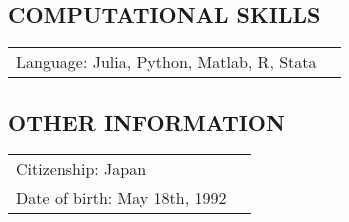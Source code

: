 \documentclass{article}
\begin{document}
\subsection*{COMPUTATIONAL SKILLS}
\begin{tabularx}{\textwidth}{lX}
Language: Julia, Python, Matlab, R, Stata
\end{tabularx}

\subsection*{OTHER INFORMATION}
\begin{tabularx}{\textwidth}{lX}
Citizenship: Japan \\
Date of birth: May 18th, 1992 \\
\end{tabularx}

%
%
       
 
\end{document}
